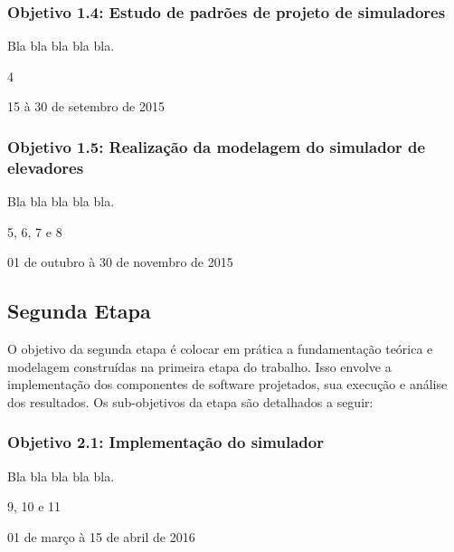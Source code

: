 \subsubsection{\textbf{Objetivo 1.4}: Estudo de padrões de projeto de simuladores}

\begin{description}[leftmargin=!,labelwidth=\widthof{\bfseries Descrição}]
  \item[Descrição] Bla bla bla bla bla.
  \item[Iterações] 4
  \item[Período]   15 à 30 de setembro de 2015
\end{description}

\subsubsection{\textbf{Objetivo 1.5}: Realização da modelagem do simulador de elevadores}

\begin{description}[leftmargin=!,labelwidth=\widthof{\bfseries Descrição}]
  \item[Descrição] Bla bla bla bla bla.
  \item[Iterações] 5, 6, 7 e 8
  \item[Período]   01 de outubro à 30 de novembro de 2015
\end{description}

\subsection{Segunda Etapa}

O objetivo da segunda etapa é colocar em prática a fundamentação teórica e modelagem construídas na primeira etapa do trabalho. Isso envolve a implementação dos componentes de software projetados, sua execução e análise dos resultados. Os sub-objetivos da etapa são detalhados a seguir:

\subsubsection{\textbf{Objetivo 2.1}: Implementação do simulador}

\begin{description}[leftmargin=!,labelwidth=\widthof{\bfseries Descrição}]
  \item[Descrição] Bla bla bla bla bla.
  \item[Iterações] 9, 10 e 11
  \item[Período]   01 de março à 15 de abril de 2016
\end{description}


